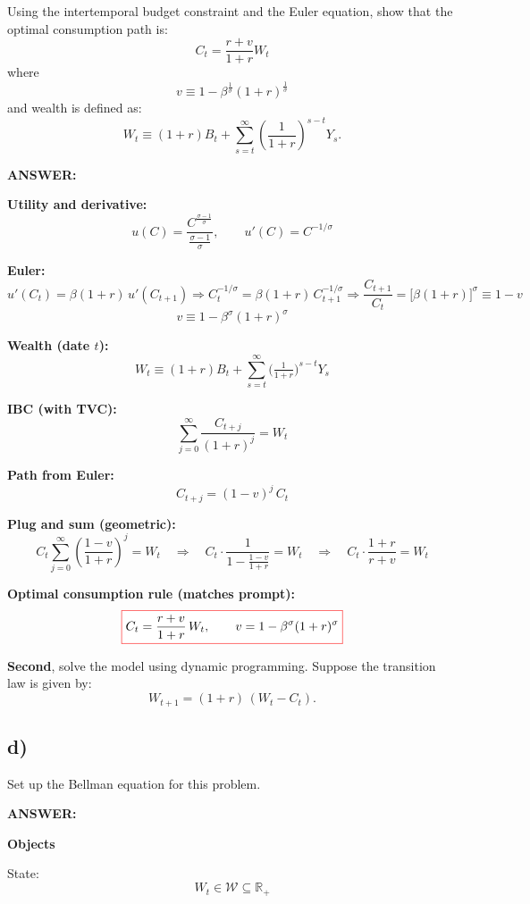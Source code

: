 \documentclass[12pt]{article}
\begin{document}
Using the intertemporal budget constraint and the Euler equation, show that the optimal consumption path is:
\[
C_t = \frac{r+v}{1+r} W_t
\]
where 
\[
v \equiv 1 - \beta^{\tfrac{1}{\sigma}} (1+r)^{\tfrac{1}{\sigma}}
\]
and wealth is defined as:
\[
W_t \equiv (1+r)B_t + \sum_{s=t}^{\infty} \left(\frac{1}{1+r}\right)^{s-t} Y_s.
\]

\vspace{0.5em}
\noindent\textcolor{formalred}{\textbf{ANSWER:}}

\textbf{Utility and derivative:}
\[
u(C)=\frac{C^{\tfrac{\sigma-1}{\sigma}}}{\tfrac{\sigma-1}{\sigma}},\qquad
u'(C)=C^{-1/\sigma}
\]

\textbf{Euler:}
\[
u'(C_t)=\beta(1+r)\,u'(C_{t+1})
\Rightarrow
C_t^{-1/\sigma}=\beta(1+r)\,C_{t+1}^{-1/\sigma}
\Rightarrow
\frac{C_{t+1}}{C_t}=\big[\beta(1+r)\big]^{\sigma}\equiv 1-v
\]
\[
\boxed{\,v \equiv 1-\beta^{\sigma}(1+r)^{\sigma}\,}
\]

\textbf{Wealth (date $t$):}
\[
\boxed{\,W_t \equiv (1+r)B_t+\sum_{s=t}^{\infty}\Big(\tfrac{1}{1+r}\Big)^{s-t}Y_s\,}
\]

\textbf{IBC (with TVC):}
\[
\sum_{j=0}^{\infty}\frac{C_{t+j}}{(1+r)^j}=W_t
\]

\textbf{Path from Euler:}
\[
C_{t+j}=(1-v)^j\,C_t
\]

\textbf{Plug and sum (geometric):}
\[
C_t\sum_{j=0}^{\infty}\left(\frac{1-v}{1+r}\right)^j=W_t
\quad\Rightarrow\quad
C_t\cdot\frac{1}{1-\frac{1-v}{1+r}}=W_t
\quad\Rightarrow\quad
C_t\cdot\frac{1+r}{r+v}=W_t
\]

\textbf{Optimal consumption rule (matches prompt):}
\[
\fcolorbox{red}{white}{$\displaystyle
C_t=\frac{r+v}{1+r}\,W_t,\qquad
v=1-\beta^{\sigma}(1+r)^{\sigma}
$}
\]

\textbf{Second}, solve the model using dynamic programming. Suppose the transition law is given by:
\[
W_{t+1} = (1+r)\,(W_t - C_t).
\]

\subsection*{\noindent\textbf{d)}}

Set up the Bellman equation for this problem.

\vspace{0.5em}
\noindent\textcolor{formalred}{\textbf{ANSWER:}}

\textbf{Objects}

State:
\[
W_t \in \mathcal{W}\subseteq \mathbb{R}_+ 
\]
\end{document}
